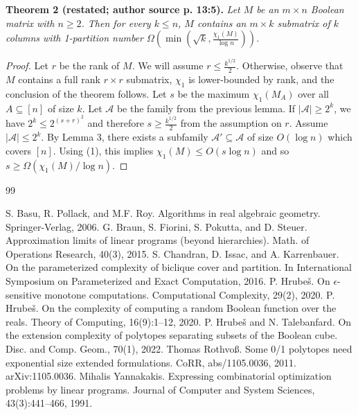\documentclass[10pt,a4paper]{article}
\newenvironment{originalresult}[1]{\par\medskip\noindent\textbf{#1.}\itshape}{\par\medskip}
\begin{document}
\begin{originalresult}{Theorem 2 (restated; author source p. 13:5)}
Let $M$ be an $m\times n$ Boolean matrix with $n\ge2$. Then for every $k\le n$, $M$ contains an $m\times k$ submatrix of $k$ columns with 1-partition number $\Omega(\min(\sqrt{k},\frac{\chi_1(M)}{\log n}))$.
\end{originalresult}

\begin{proof}
Let $r$ be the rank of $M$. We will assume $r\le\frac{k^{1/2}}2$. Otherwise, observe that $M$ contains a full rank $r\times r$ submatrix, $\chi_1$ is lower-bounded by rank, and the conclusion of the theorem follows.
Let $s$ be the maximum $\chi_1(M_A)$ over all $A\subseteq[n]$ of size $k$. Let $\mathcal A$ be the family from the previous lemma. If $|\mathcal A|\ge2^k$, we have $2^k\le2^{(s+r)^2}$ and therefore $s\ge\frac{k^{1/2}}2$ from the assumption on $r$.
Assume $|\mathcal A|\le2^k$. By Lemma 3, there exists a subfamily $\mathcal A'\subseteq\mathcal A$ of size $O(\log n)$ which covers $[n]$. Using (1), this implies $\chi_1(M)\le O(s\log n)$ and so $s\ge\Omega(\chi_1(M)/\log n)$.
\end{proof}

\begin{thebibliography}{99}

 S. Basu, R. Pollack, and M.F. Roy. Algorithms in real algebraic geometry. Springer-Verlag, 2006.
 G. Braun, S. Fiorini, S. Pokutta, and D. Steuer. Approximation limits of linear programs (beyond hierarchies). Math. of Operations Research, 40(3), 2015.
 S. Chandran, D. Issac, and A. Karrenbauer. On the parameterized complexity of biclique cover and partition. In International Symposium on Parameterized and Exact Computation, 2016.
 P. Hrube\v{s}. On $\epsilon$-sensitive monotone computations. Computational Complexity, 29(2), 2020.
 P. Hrube\v{s}. On the complexity of computing a random Boolean function over the reals. Theory of Computing, 16(9):1--12, 2020.
 P. Hrube\v{s} and N. Talebanfard. On the extension complexity of polytopes separating subsets of the Boolean cube. Disc. and Comp. Geom., 70(1), 2022.
 Thomas Rothvo\ss. Some 0/1 polytopes need exponential size extended formulations. CoRR, abs/1105.0036, 2011. arXiv:1105.0036.
 Mihalis Yannakakis. Expressing combinatorial optimization problems by linear programs. Journal of Computer and System Sciences, 43(3):441--466, 1991.

\end{thebibliography}
\end{document}
